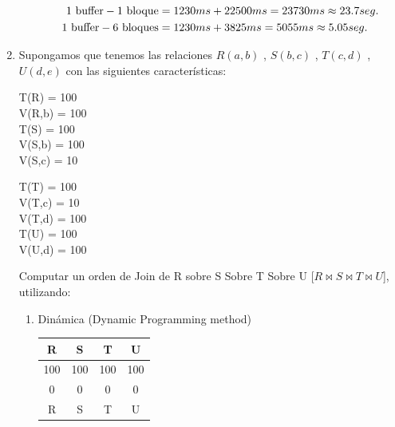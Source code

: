 \documentclass{templateNote}
\begin{document}
\begin{enumerate}
\begin{enumerate}[label=\alph*)]
        \begin{align*}
            1 \textnormal{ buffer} - 1 \textnormal{ bloque} &= 1230 ms + 22500 ms = 23730 ms \approx 23.7 seg.\\ %
            1 \textnormal{ buffer} - 6 \textnormal{ bloques} &= 1230 ms + 3825 ms = 5055 ms \approx 5.05 seg.\\ %
        \end{align*}
    \end{enumerate}

    \item Supongamos que tenemos las relaciones $R(a,b)$ , $S(b,c)$ , $T(c,d)$ , $U(d,e)$ con las siguientes características:\\
        
        \begin{center}
            \begin{minipage}{0.3\textwidth}
                T(R) = 100 \\
                V(R,b) = 100 \\
                T(S) = 100 \\
                V(S,b) = 100 \\
                V(S,c) = 10 \\
                \end{minipage}%
                \begin{minipage}{0.3\textwidth}
                T(T) = 100 \\
                V(T,c) = 10 \\
                V(T,d) = 100 \\
                T(U) = 100 \\
                V(U,d) = 100 \\
            \end{minipage}
        \end{center}    

        \noindent Computar un orden de Join de R sobre S Sobre T Sobre U [$R \Join S \Join T \Join U$], utilizando:

        \begin{enumerate}[label=\alph*)]
            \item Dinámica (Dynamic Programming method) \\
            
                \begin{center}
                    \begin{tabular}{|c|c|c|c|}
                        \hline
                        R & S & T & U \\
                        \hline
                        100 & 100 & 100 & 100 \\
                        \hline
                        0 & 0 & 0 & 0 \\
                        \hline
                        R & S & T & U \\
                        \hline
                    \end{tabular}
                \end{center}


\end{enumerate}
\end{enumerate}
\end{document}
